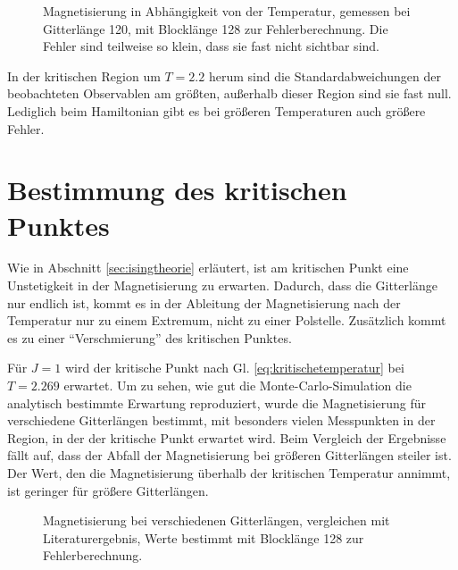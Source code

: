 	
	\begin{figure}[htbp]
		
		\caption[Magnetisierung in Abhängigkeit von der Temperatur]{Magnetisierung in Abhängigkeit von der Temperatur, gemessen bei Gitterlänge 120, mit Blocklänge 128 zur Fehlerberechnung. Die Fehler sind teilweise so klein, dass sie fast nicht sichtbar sind.}
		\label{fig:ergebnismagnetisierung}
	\end{figure}
	
	In der kritischen Region um $T=\num{2,2}$ herum sind die Standardabweichungen der beobachteten Observablen am größten, außerhalb dieser Region sind sie fast null. Lediglich beim Hamiltonian gibt es bei größeren Temperaturen auch größere Fehler. 
	
	\section{Bestimmung des kritischen Punktes}
	\label{sec:bestkritpunkt}
	
	Wie in Abschnitt \ref{sec:isingtheorie} erläutert, ist am kritischen Punkt eine Unstetigkeit in der Magnetisierung zu erwarten. Dadurch, dass die Gitterlänge nur endlich ist, kommt es in der Ableitung der Magnetisierung nach der Temperatur nur zu einem Extremum, nicht zu einer Polstelle. Zusätzlich kommt es zu einer \enquote{Verschmierung} des kritischen Punktes\cite[vgl. ][S. 104]{binderheermann}.
	
	Für $J=1$ wird der kritische Punkt nach Gl. \ref{eq:kritischetemperatur} bei $T=\num{2,269}$ erwartet.
	Um zu sehen, wie gut die Monte-Carlo-Simulation die analytisch bestimmte Erwartung reproduziert, wurde die Magnetisierung für verschiedene Gitterlängen bestimmt, mit besonders vielen Messpunkten in der Region, in der der kritische Punkt erwartet wird. Beim Vergleich der Ergebnisse fällt auf, dass der Abfall der Magnetisierung bei größeren Gitterlängen steiler ist. Der Wert, den die Magnetisierung überhalb der kritischen Temperatur annimmt, ist geringer für größere Gitterlängen.
	
	\begin{figure}[htbp]
		
		\caption[Magnetisierung bei verschiedenen Gitterlängen]{Magnetisierung bei verschiedenen Gitterlängen, vergleichen mit Literaturergebnis, Werte bestimmt mit Blocklänge 128 zur Fehlerberechnung.}
		\label{fig:maglaenge}
	\end{figure}
	
